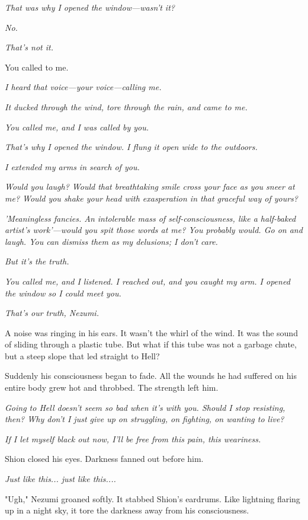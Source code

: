 \emph{That was why I opened the window---wasn't it?}

\emph{No.}

\emph{That's not it.}

You called to me.

\emph{I heard that voice---your voice---calling me.}

\emph{It ducked through the wind, tore through the rain, and came to me.}

\emph{You called me, and I was called by you.}

\emph{That's why I opened the window. I flung it open wide to the outdoors.}

\emph{I extended my arms in search of you.}

\emph{Would you laugh? Would that breathtaking smile cross your face as you
sneer at me? Would you shake your head with exasperation in that
graceful way of yours?}

\emph{'Meaningless fancies. An intolerable mass of self-consciousness, like a
half-baked artist's work'---would you spit those words at me? You probably
would. Go on and laugh. You can dismiss them as my delusions; I don't
care.}

\emph{But it's the truth.}

\emph{You called me, and I listened. I reached out, and you caught my arm. I
opened the window so I could meet you.}

\emph{That's our truth, Nezumi.}

A noise was ringing in his ears. It wasn't the whirl of the wind. It was
the sound of sliding through a plastic tube. But what if this tube was
not a garbage chute, but a steep slope that led straight to Hell?

Suddenly his consciousness began to fade. All the wounds he had suffered
on his entire body grew hot and throbbed. The strength left him.

\emph{Going to Hell doesn't seem so bad when it's with you. Should I stop
resisting, then? Why don't I just give up on struggling, on fighting, on
wanting to live?}

\emph{If I let myself black out now, I'll be free from this pain, this
weariness.}

Shion closed his eyes. Darkness fanned out before him.

\emph{Just like this... just like this....}

"Ugh," Nezumi groaned softly. It stabbed Shion's eardrums. Like
lightning flaring up in a night sky, it tore the darkness away from his
consciousness.

